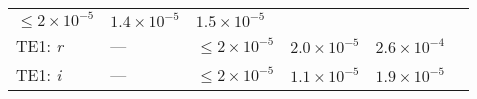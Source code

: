 \documentclass[DM, lsstdraft, toc]{lsstdoc}
\begin{document}
\begin{longtable}[]{@{}llllll@{}}
\begin{minipage}[t]{0.14\columnwidth}
\(\leq 2\times10^{-5}\)\strut
\end{minipage} & \begin{minipage}[t]{0.12\columnwidth}\raggedright\strut
\(1.4\times10^{-5}\) \strut
\end{minipage} & \begin{minipage}[t]{0.12\columnwidth}\raggedright\strut
\(1.5\times10^{-5}\) \strut
\end{minipage} & \begin{minipage}[t]{0.17\columnwidth}\raggedright\strut
\strut
\end{minipage}\tabularnewline
\begin{minipage}[t]{0.12\columnwidth}\raggedright\strut
TE1: \emph{r}\strut
\end{minipage} & \begin{minipage}[t]{0.06\columnwidth}\raggedright\strut
---\strut
\end{minipage} & \begin{minipage}[t]{0.14\columnwidth}\raggedright\strut
\(\leq 2\times10^{-5}\)\strut
\end{minipage} & \begin{minipage}[t]{0.12\columnwidth}\raggedright\strut
\(2.0\times10^{-5}\)\strut
\end{minipage} & \begin{minipage}[t]{0.12\columnwidth}\raggedright\strut
\(2.6\times10^{-4}\)\strut
\end{minipage} & \begin{minipage}[t]{0.17\columnwidth}\raggedright\strut
\strut
\end{minipage}\tabularnewline
\begin{minipage}[t]{0.12\columnwidth}\raggedright\strut
TE1: \emph{i}\strut
\end{minipage} & \begin{minipage}[t]{0.06\columnwidth}\raggedright\strut
---\strut
\end{minipage} & \begin{minipage}[t]{0.14\columnwidth}\raggedright\strut
\(\leq 2\times10^{-5}\)\strut
\end{minipage} & \begin{minipage}[t]{0.12\columnwidth}\raggedright\strut
\(1.1\times10^{-5}\)\strut
\end{minipage} & \begin{minipage}[t]{0.12\columnwidth}\raggedright\strut
\(1.9\times10^{-5}\)\strut
\end{minipage} & \begin{minipage}[t]{0.17\columnwidth}\raggedright\strut

\end{minipage}
\end{longtable}
\end{document}
